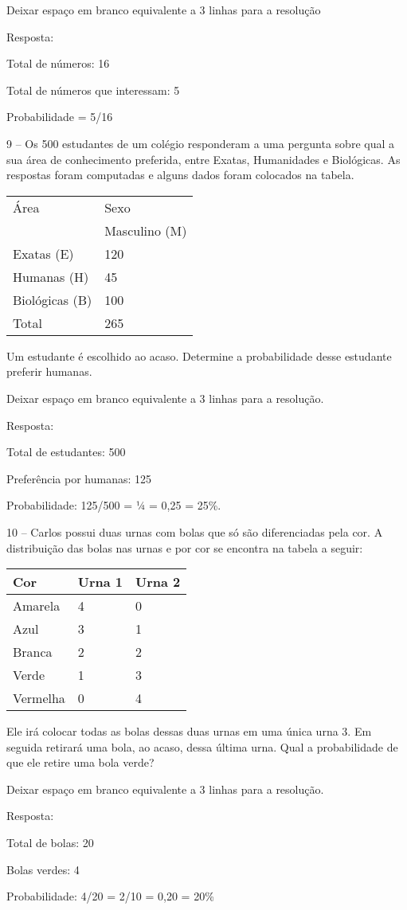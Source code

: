 Deixar espaço em branco equivalente a 3 linhas para a resolução

Resposta:

Total de números: 16

Total de números que interessam: 5

Probabilidade = 5/16

9 -- Os 500 estudantes de um colégio responderam a uma pergunta sobre
qual a sua área de conhecimento preferida, entre Exatas, Humanidades e
Biológicas. As respostas foram computadas e alguns dados foram colocados
na tabela.

\begin{longtable}[]{@{}ll@{}}
\toprule
Área & Sexo\tabularnewline
& Masculino (M)\tabularnewline
Exatas (E) & 120\tabularnewline
Humanas (H) & 45\tabularnewline
Biológicas (B) & 100\tabularnewline
Total & 265\tabularnewline
\bottomrule
\end{longtable}

Um estudante é escolhido ao acaso. Determine a probabilidade desse
estudante preferir humanas.

Deixar espaço em branco equivalente a 3 linhas para a resolução.

Resposta:

Total de estudantes: 500

Preferência por humanas: 125

Probabilidade: 125/500 = ¼ = 0,25 = 25\%.

10 -- Carlos possui duas urnas com bolas que só são diferenciadas pela
cor. A distribuição das bolas nas urnas e por cor se encontra na tabela
a seguir:

\begin{longtable}[]{@{}lll@{}}
\toprule
Cor & Urna 1 & Urna 2\tabularnewline
\midrule
\endhead
Amarela & 4 & 0\tabularnewline
Azul & 3 & 1\tabularnewline
Branca & 2 & 2\tabularnewline
Verde & 1 & 3\tabularnewline
Vermelha & 0 & 4\tabularnewline
\bottomrule
\end{longtable}

Ele irá colocar todas as bolas dessas duas urnas em uma única urna 3. Em
seguida retirará uma bola, ao acaso, dessa última urna. Qual a
probabilidade de que ele retire uma bola verde?

Deixar espaço em branco equivalente a 3 linhas para a resolução.

Resposta:

Total de bolas: 20

Bolas verdes: 4

Probabilidade: 4/20 = 2/10 = 0,20 = 20\%

